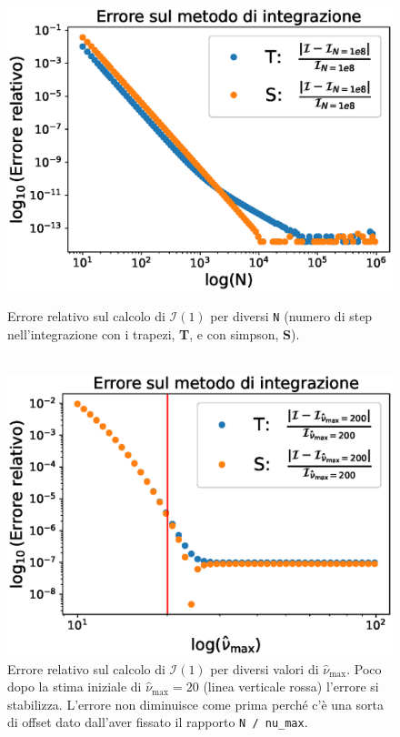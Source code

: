\documentclass[a4paper, titlepage]{article}
\begin{document}
\begin{figure}[h]
    \begin{minipage}{0.49 \textwidth}
        \centering
        \includegraphics[width = \textwidth]{Figures/Pot_cvgN.eps}
        \caption{Errore relativo sul calcolo di $\mathcal I(1)$ per diversi
        \texttt{N} (numero di step nell'integrazione con i trapezi, \textbf{T},
        e con simpson, \textbf{S}).  \\ \\}
        \label{fig:Pot_cvgN}
    \end{minipage}
    \hspace{0.01 \textwidth}
    \begin{minipage}{0.49 \textwidth}
        \centering
        \includegraphics[width = \textwidth]{Figures/Pot_cvgA.eps}
        \caption{Errore relativo sul calcolo di $\mathcal I (1)$ per diversi
        valori di $\hat \nu_\text{max}$.
        Poco dopo la stima iniziale di  $\hat \nu_\text{max} = \num{20}$ (linea
        verticale rossa) l'errore si stabilizza.
        L'errore non diminuisce come prima perché c'è una sorta di offset dato
        dall'aver fissato il rapporto \texttt{N / nu\_max}.}
        \label{fig:Pot_cvgA}
    \end{minipage}
\end{figure}
\end{document}
